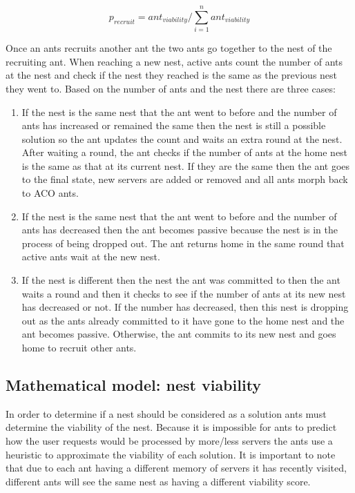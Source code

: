 \documentclass[conference]{IEEEtran}
\begin{document}
\begin{equation}
p_{recruit} = ant_{viability} / \sum\limits_{i=1}^n ant_{viability}
\end{equation}

Once an ants recruits another ant the two ants go together to the nest of the recruiting ant. When reaching a new nest, active ants count the number of ants at the nest and check if the nest they reached is the same as the previous nest they went to. Based on the number of ants and the nest there are three cases:

\begin{enumerate}
	\item If the nest is the same nest that the ant went to before and the number of ants has increased or remained the same then the nest is still a possible solution so the ant updates the count and waits an extra round at the nest. After waiting a round, the ant checks if the number of ants at the home nest is the same as that at its current nest. If they are the same then the ant goes to the final state, new servers are added or removed and all ants morph back to ACO ants.
	\item If the nest is the same nest that the ant went to before and the number of ants has decreased then the ant becomes passive because the nest is in the process of being dropped out. The ant returns home in the same round that active ants wait at the new nest.
	\item If the nest is different then the nest the ant was committed to then the ant waits a round and then it checks to see if the number of ants at its new nest has decreased or not. If the number has decreased, then this nest is dropping out as the ants already committed to it have gone to the home nest and the ant becomes passive. Otherwise, the ant commits to its new nest and goes home to recruit other ants.
\end{enumerate}
\subsection{Mathematical model: nest viability}

In order to determine if a nest should be considered as a solution ants must determine the viability of the nest. Because it is impossible for ants to predict how the user requests would be processed by more/less servers the ants use a heuristic to approximate the viability of each solution. It is important to note that due to each ant having a different memory of servers it has recently visited, different ants will see the same nest as having a different viability score.
\end{document}
